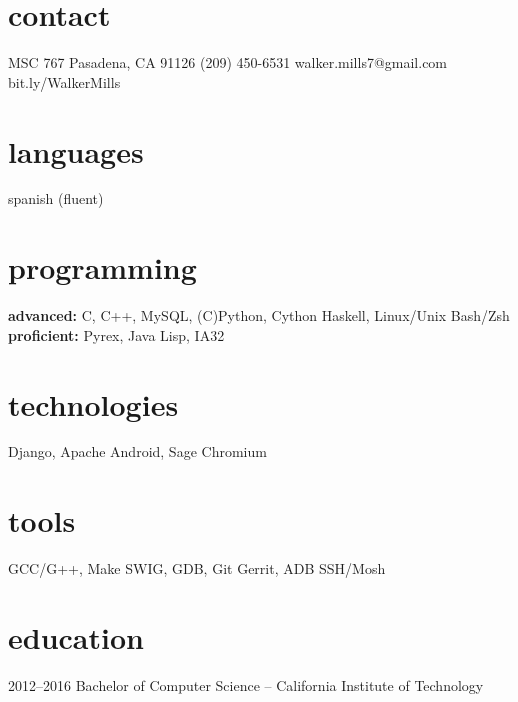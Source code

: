 \documentclass[]{mills-cv} %
\begin{document}


\begin{aside} %
\section{contact}
MSC 767
Pasadena, CA 91126
(209) 450-6531
\small walker.mills7@gmail.com
bit.ly/WalkerMills
\section{languages}
spanish (fluent)
\section{programming}
\textbf{advanced:}
C, C++, MySQL,
(C)Python, Cython
Haskell, Linux/Unix
Bash/Zsh
\textbf{proficient:}
Pyrex, Java
Lisp, IA32
\section{technologies}
Django, Apache
Android, Sage
Chromium
\section{tools}
GCC/G++, Make
SWIG, GDB, Git
Gerrit, ADB
SSH/Mosh
\end{aside}


\section{education}

\begin{entrylist}
\entry
{2012--2016}
{Bachelor of Computer Science \normalfont -- California Institute of Technology}{}{}
\end{entrylist}
\end{document}
